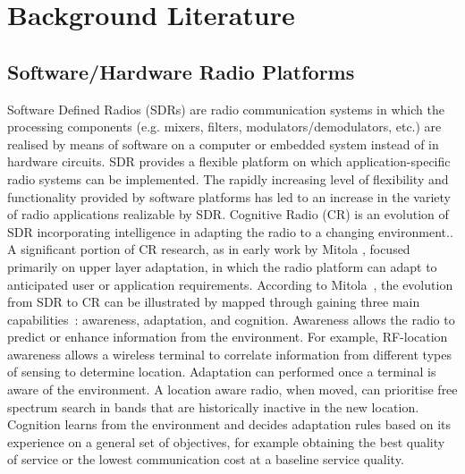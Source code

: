 \chapter{Background Literature}
\label{chap:BackgroundLiterature}

\section{Software/Hardware Radio Platforms}
Software Defined Radios (SDRs) are radio communication systems in which the processing components (e.g. mixers, filters, modulators/demodulators, etc.) are realised by means of software on a computer or embedded system instead of in hardware circuits.
SDR provides a flexible platform on which application-specific radio systems can be implemented. The rapidly increasing level of flexibility and functionality provided by software platforms has led to an increase in the variety of radio applications realizable by SDR.
Cognitive Radio (CR) is an evolution of SDR incorporating intelligence in adapting the radio to a changing environment..
A significant portion of CR research, as in early work by Mitola \cite{Mitola1999}, focused primarily on upper layer adaptation, in which the radio platform can adapt to anticipated user or application requirements.
According to Mitola~\cite{Mitola2006}, the evolution from SDR to CR can be illustrated by mapped through gaining three main capabilities~\cite{Recio2010a}: awareness, adaptation, and cognition.
Awareness allows the radio to predict or enhance information from the environment. For example, RF-location awareness allows a wireless terminal to correlate information from different types of sensing to determine location.
Adaptation can performed once a terminal is aware of the environment. A location aware radio, when moved, can prioritise free spectrum search in bands that are historically inactive in the new location.
Cognition learns from the environment and decides adaptation rules based on its experience on a general set of objectives, for example obtaining the best quality of service or the lowest communication cost at a baseline service quality.

